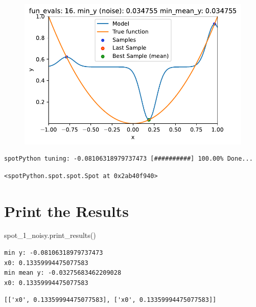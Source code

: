 \documentclass[
  letterpaper,
  DIV=11,
  numbers=noendperiod]{scrreprt}
\newenvironment{Shaded}{\begin{snugshade}}{\end{snugshade}}
\newcommand{\NormalTok}[1]{\textcolor[rgb]{0.00,0.23,0.31}{#1}}
\begin{document}
\begin{figure}[H]

{\centering \includegraphics{014_num_spot_ocba_files/figure-pdf/cell-6-output-10.pdf}

}

\end{figure}

\begin{verbatim}
spotPython tuning: -0.08106318979737473 [##########] 100.00% Done...
\end{verbatim}

\begin{verbatim}
<spotPython.spot.spot.Spot at 0x2ab40f940>
\end{verbatim}

\hypertarget{print-the-results-4}{%
\section{Print the Results}\label{print-the-results-4}}

\begin{Shaded}
\begin{Highlighting}[]
\NormalTok{spot\_1\_noisy.print\_results()}
\end{Highlighting}
\end{Shaded}

\begin{verbatim}
min y: -0.08106318979737473
x0: 0.13359994475077583
min mean y: -0.03275683462209028
x0: 0.13359994475077583
\end{verbatim}

\begin{verbatim}
[['x0', 0.13359994475077583], ['x0', 0.13359994475077583]]
\end{verbatim}
\end{document}
